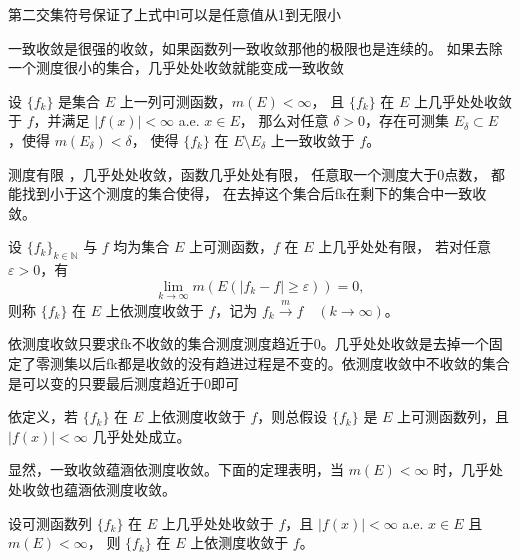 \documentclass[lang=cn,10pt]{elegantbook}
\begin{document}
第二交集符号保证了上式中l可以是任意值从1到无限小
\begin{proposition}[几乎处处收敛和一致收敛的关系]
一致收敛是很强的收敛，如果函数列一致收敛那他的极限也是连续的。
如果去除一个测度很小的集合，几乎处处收敛就能变成一致收敛
    
\end{proposition}
\begin{theorem}[Egorov 定理]
设 $\{f_k\}$ 是集合 $E$ 上一列可测函数，$m(E) < \infty$，  
且 $\{f_k\}$ 在 $E$ 上几乎处处收敛于 $f$，并满足 $|f(x)| < \infty$ a.e. $x \in E$，  
那么对任意 $\delta > 0$，存在可测集 $E_\delta \subset E$，使得 $m(E_\delta) < \delta$，  
使得 $\{f_k\}$ 在 $E \setminus E_\delta$ 上一致收敛于 $f$。
\end{theorem}
测度有限 ，几乎处处收敛，函数几乎处处有限， 任意取一个测度大于0点数， 都能找到小于这个测度的集合使得， 在去掉这个集合后fk在剩下的集合中一致收敛。
\begin{definition}[依测度收敛]
设 $\{f_k\}_{k \in \mathbb{N}}$ 与 $f$ 均为集合 $E$ 上可测函数，$f$ 在 $E$ 上几乎处处有限，  
若对任意 $\varepsilon > 0$，有
\[
\lim_{k \to \infty} m\left(E\left(|f_k - f| \geq \varepsilon\right)\right) = 0,
\]
则称 $\{f_k\}$ 在 $E$ 上依测度收敛于 $f$，记为 $f_k \xrightarrow{m} f \quad (k \to \infty)$。
\end{definition}
依测度收敛只要求fk不收敛的集合测度测度趋近于0。几乎处处收敛是去掉一个固定了零测集以后fk都是收敛的没有趋进过程是不变的。依测度收敛中不收敛的集合是可以变的只要最后测度趋近于0即可
\begin{remark}
依定义，若 $\{f_k\}$ 在 $E$ 上依测度收敛于 $f$，则总假设 $\{f_k\}$ 是 $E$ 上可测函数列，且 $|f(x)| < \infty$ 几乎处处成立。

显然，一致收敛蕴涵依测度收敛。下面的定理表明，当 $m(E) < \infty$ 时，几乎处处收敛也蕴涵依测度收敛。
\end{remark}
\begin{theorem}[几乎处处收敛蕴涵依测度收敛]
设可测函数列 $\{f_k\}$ 在 $E$ 上几乎处处收敛于 $f$，且 $|f(x)| < \infty$ a.e. $x \in E$ 且 $m(E) < \infty$，  
则 $\{f_k\}$ 在 $E$ 上依测度收敛于 $f$。
\end{theorem}
\end{document}
